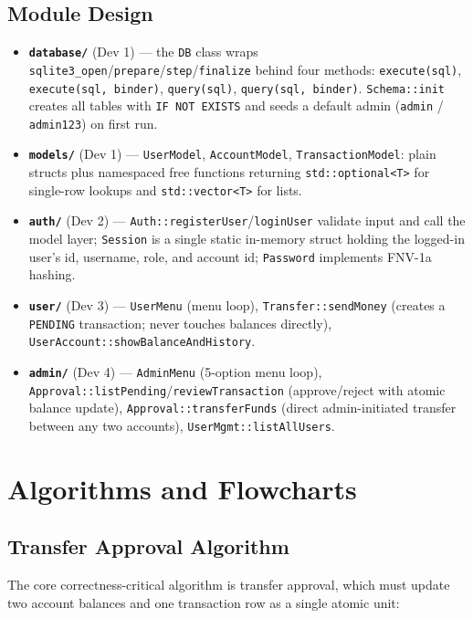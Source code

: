 \subsection{Module Design}
\begin{itemize}
    \item \textbf{\texttt{database/}} (Dev 1) --- the \texttt{DB} class wraps \texttt{sqlite3\_open}/\texttt{prepare}/\texttt{step}/\texttt{finalize} behind four methods: \texttt{execute(sql)}, \texttt{execute(sql, binder)}, \texttt{query(sql)}, \texttt{query(sql, binder)}. \texttt{Schema::init} creates all tables with \texttt{IF NOT EXISTS} and seeds a default admin (\texttt{admin} / \texttt{admin123}) on first run.
    \item \textbf{\texttt{models/}} (Dev 1) --- \texttt{UserModel}, \texttt{AccountModel}, \texttt{TransactionModel}: plain structs plus namespaced free functions returning \texttt{std::optional<T>} for single-row lookups and \texttt{std::vector<T>} for lists.
    \item \textbf{\texttt{auth/}} (Dev 2) --- \texttt{Auth::registerUser}/\texttt{loginUser} validate input and call the model layer; \texttt{Session} is a single static in-memory struct holding the logged-in user's id, username, role, and account id; \texttt{Password} implements FNV-1a hashing.
    \item \textbf{\texttt{user/}} (Dev 3) --- \texttt{UserMenu} (menu loop), \texttt{Transfer::sendMoney} (creates a \texttt{PENDING} transaction; never touches balances directly), \texttt{UserAccount::showBalanceAndHistory}.
    \item \textbf{\texttt{admin/}} (Dev 4) --- \texttt{AdminMenu} (5-option menu loop), \texttt{Approval::listPending}/\texttt{reviewTransaction} (approve/reject with atomic balance update), \texttt{Approval::transferFunds} (direct admin-initiated transfer between any two accounts), \texttt{UserMgmt::listAllUsers}.
\end{itemize}

\section{Algorithms and Flowcharts}

\subsection{Transfer Approval Algorithm}
The core correctness-critical algorithm is transfer approval, which must update two account balances and one transaction row as a single atomic unit:

